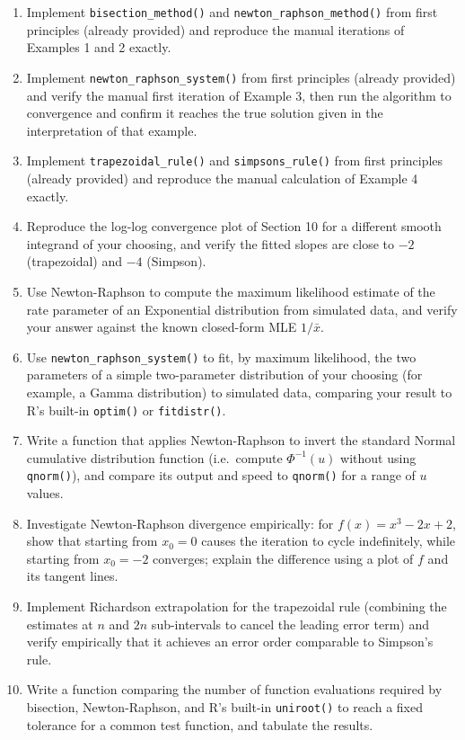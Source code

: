 \documentclass[
]{article}
\providecommand{\tightlist}{%
  \setlength{\itemsep}{0pt}\setlength{\parskip}{0pt}}
\begin{document}
\begin{enumerate}
\def\labelenumi{\arabic{enumi}.}
\tightlist
\item
  Implement \texttt{bisection\_method()} and
  \texttt{newton\_raphson\_method()} from first principles (already
  provided) and reproduce the manual iterations of Examples 1 and 2
  exactly.
\item
  Implement \texttt{newton\_raphson\_system()} from first principles
  (already provided) and verify the manual first iteration of Example 3,
  then run the algorithm to convergence and confirm it reaches the true
  solution given in the interpretation of that example.
\item
  Implement \texttt{trapezoidal\_rule()} and \texttt{simpsons\_rule()}
  from first principles (already provided) and reproduce the manual
  calculation of Example 4 exactly.
\item
  Reproduce the log-log convergence plot of Section 10 for a different
  smooth integrand of your choosing, and verify the fitted slopes are
  close to \(-2\) (trapezoidal) and \(-4\) (Simpson).
\item
  Use Newton-Raphson to compute the maximum likelihood estimate of the
  rate parameter of an Exponential distribution from simulated data, and
  verify your answer against the known closed-form MLE \(1/\bar x\).
\item
  Use \texttt{newton\_raphson\_system()} to fit, by maximum likelihood,
  the two parameters of a simple two-parameter distribution of your
  choosing (for example, a Gamma distribution) to simulated data,
  comparing your result to R's built-in \texttt{optim()} or
  \texttt{fitdistr()}.
\item
  Write a function that applies Newton-Raphson to invert the standard
  Normal cumulative distribution function (i.e.~compute \(\Phi^{-1}(u)\)
  without using \texttt{qnorm()}), and compare its output and speed to
  \texttt{qnorm()} for a range of \(u\) values.
\item
  Investigate Newton-Raphson divergence empirically: for
  \(f(x)=x^3-2x+2\), show that starting from \(x_0=0\) causes the
  iteration to cycle indefinitely, while starting from \(x_0=-2\)
  converges; explain the difference using a plot of \(f\) and its
  tangent lines.
\item
  Implement Richardson extrapolation for the trapezoidal rule (combining
  the estimates at \(n\) and \(2n\) sub-intervals to cancel the leading
  error term) and verify empirically that it achieves an error order
  comparable to Simpson's rule.
\item
  Write a function comparing the number of function evaluations required
  by bisection, Newton-Raphson, and R's built-in \texttt{uniroot()} to
  reach a fixed tolerance for a common test function, and tabulate the
  results.
\end{enumerate}
\end{document}
